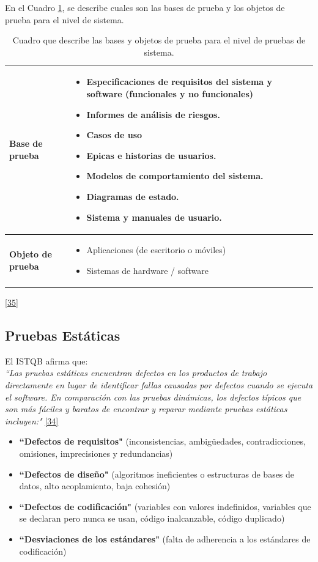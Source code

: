  	En el Cuadro \ref{tbl:basesyobjetos},  se describe cuales son las bases de prueba y los objetos de prueba para el nivel de sistema.
 

\begin{table}[H]
	\centering
	\begin{tabular}{|p{3.5cm}|p{13cm}|}
		\hline
		\centering \textbf{Base de prueba} & \begin{itemize}
			\item Especificaciones de requisitos del sistema y software (funcionales y no funcionales)
			\item Informes de análisis de riesgos.
			\item Casos de uso
			\item Epicas e historias de usuarios.
			\item Modelos de comportamiento del sistema.
			\item Diagramas de estado.
			\item Sistema y manuales de usuario.
		\end{itemize}
		  \\
		\hline
		\centering \textbf{Objeto de prueba} & \begin{itemize}
			\item Aplicaciones (de escritorio o móviles)
			\item Sistemas de hardware / software
		\end{itemize}  \\
		\hline
	\end{tabular}
\caption{Cuadro que describe las bases y objetos de prueba para el nivel de pruebas de sistema.}
\label{tbl:basesyobjetos}
\hyperlink{b35}{[35]}
\end{table}


\subsection{Pruebas Estáticas}

El ISTQB afirma que:\\

\textit {``Las pruebas estáticas encuentran defectos en los productos de trabajo directamente en lugar de identificar fallas causadas por defectos cuando se ejecuta el software.  En comparación con las pruebas dinámicas, los defectos típicos que son más fáciles y baratos de encontrar y reparar mediante pruebas estáticas incluyen:"} \hyperlink{b34}{[34]}
\begin{itemize}
	\item \textbf {``Defectos de requisitos"} (inconsistencias, ambigüedades, contradicciones, omisiones, imprecisiones y redundancias)
	\item \textbf {``Defectos de diseño"} (algoritmos ineficientes o estructuras de bases de datos, alto acoplamiento, baja cohesión)
	\item \textbf {``Defectos de codificación"} (variables con valores indefinidos, variables que se declaran pero nunca se usan, código inalcanzable, código duplicado)
	\item \textbf {``Desviaciones de los estándares"} (falta de adherencia a los estándares de codificación)
\end{itemize}

